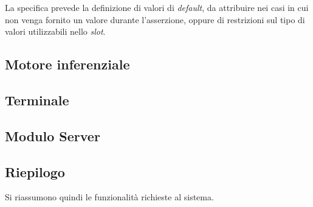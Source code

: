 La specifica prevede la definizione di valori di \emph{default}, da attribuire nei casi in cui non venga fornito un valore durante l'asserzione, oppure di restrizioni sul tipo di valori utilizzabili nello \emph{slot}.


\subsection{Motore inferenziale}



\subsection{Terminale}

\subsection{Modulo Server}

\subsection{Riepilogo}

Si riassumono quindi le funzionalità richieste al sistema.

